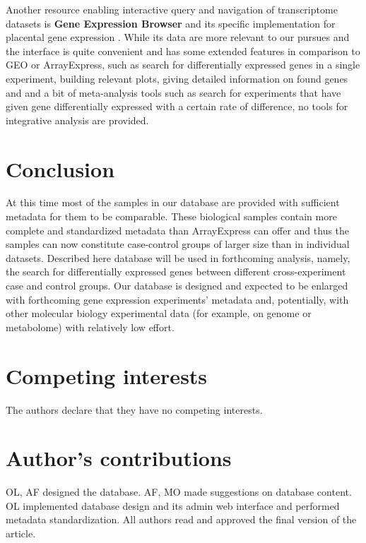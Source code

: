 \documentclass[conference]{IEEEtran}
\begin{document}
Another resource enabling interactive query and navigation of transcriptome datasets is \textbf{Gene Expression Browser} \cite{Speake2015AnData.} and its specific implementation for placental gene expression \cite{GXBPlacenta}. While its data are more relevant to our pursues and the interface is quite convenient and has some extended features in comparison to GEO or ArrayExpress, such as search for differentially expressed genes in a single experiment, building relevant plots, giving detailed information on found genes and and a bit of meta-analysis tools such as search for experiments that have given gene differentially expressed with a certain rate of difference, no tools for integrative analysis are provided.

\section{Conclusion}

At this time most of the samples in our database are provided with sufficient metadata for them to be comparable. These biological samples contain more complete and standardized metadata than ArrayExpress can offer and thus the samples can now constitute case-control groups of larger size than in individual datasets. Described here database will be used in forthcoming analysis, namely, the search for differentially expressed genes between different cross-experiment case and control groups. Our database is designed and expected to be enlarged with forthcoming gene expression experiments' metadata and, potentially, with other molecular biology experimental data (for example, on genome or metabolome) with relatively low effort. 

\section*{Competing interests}
The authors declare that they have no competing interests.

\section*{Author's contributions}
OL, AF designed the database. AF, MO made suggestions on database content. OL implemented database design and its admin web interface and performed metadata standardization.  All authors read and approved the final version of the article.



\end{document}

